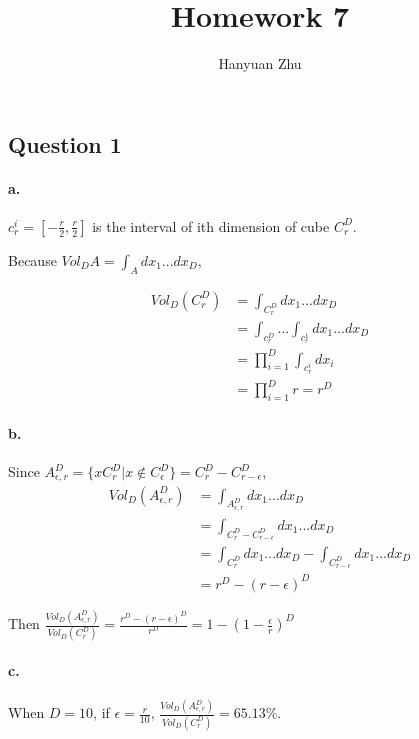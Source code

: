 \documentclass{article}
\title{Homework 7}
\author{Hanyuan Zhu}
\begin{document}
\subsection*{ Question 1}

\paragraph{a.}
$c_{r}^{i} = [-\frac{r}{2}, \frac{r}{2}]$ is the interval of ith dimension of cube $C_{r}^{D}$.

Because $ Vol_{D} A = \int_{A} dx_1 ... dx_D $,

\begin{equation}
  \begin{split}
    Vol_{D} (C_{r}^{D}) &= \int_{C_{r}^{D}} dx_1 ... dx_D\\
    &= \int_{c_{r}^{D}} ...\int_{c_{r}^{1}} dx_1 ... dx_D\\
    &= \prod_{i = 1}^{D} \int_{c_{r}^{i}} dx_i\\
    &= \prod_{i = 1}^{D} r = r^D
  \end{split}
\end{equation}

\paragraph{b.}

Since $ A_{\epsilon, r}^{D} = \{ xC_{r}^{D}| x \not\in C_{\epsilon}^{D} \} = C_{r}^{D} - C_{r - \epsilon}^{D} $,
\begin{equation}
  \begin{split}
    Vol_{D} (A_{\epsilon, r}^{D}) &= \int_{A_{\epsilon, r}^{D}} dx_1 ... dx_D \\
    &= \int_{C_{r}^{D} - C_{r - \epsilon}^{D}} dx_1 ... dx_D\\
    &= \int_{C_{r}^{D} } dx_1 ... dx_D - \int_{ C_{r - \epsilon}^{D}} dx_1 ... dx_D\\
    &= r^D - (r-\epsilon)^D
  \end{split}
\end{equation}

Then $ \frac{Vol_{D} (A_{\epsilon, r}^{D})}{Vol_{D} (C_{r}^{D})} = \frac{r^D - (r-\epsilon)^D}{r^D} = 1 - (1- \frac{\epsilon}{r})^D$

\paragraph{c.}

When $D = 10$, if $ \epsilon = \frac{r}{10}$, $\frac{Vol_{D} (A_{\epsilon, r}^{D})}{Vol_{D} (C_{r}^{D})} = 65.13 \% $.
\end{document}
